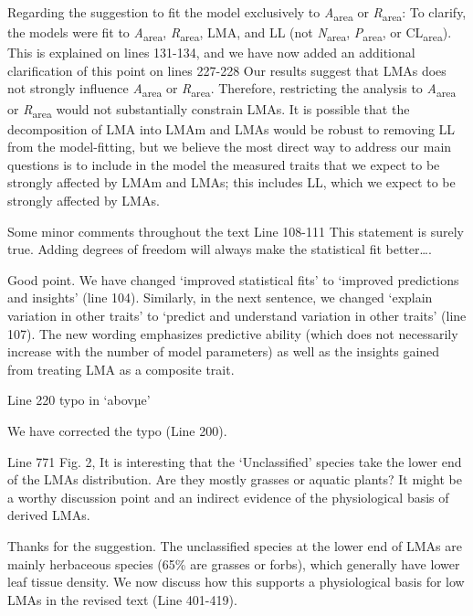 \documentclass[
  12pt,
  letterpaper,
  DIV=11,
  numbers=noendperiod]{scrartcl}
\renewenvironment{quote}
  {\begin{customblockquote}\color{blockquote-text}\ignorespaces}
  {\end{customblockquote}}
\begin{document}
Regarding the suggestion to fit the model exclusively to
\emph{A}\textsubscript{area} or \emph{R}\textsubscript{area}: To
clarify, the models were fit to \emph{A}\textsubscript{area},
\emph{R}\textsubscript{area}, LMA, and LL (not
\emph{N}\textsubscript{area}, \emph{P}\textsubscript{area}, or
CL\textsubscript{area}). This is explained on lines 131-134, and we have
now added an additional clarification of this point on lines 227-228 Our
results suggest that LMAs does not strongly influence
\emph{A}\textsubscript{area} or \emph{R}\textsubscript{area}. Therefore,
restricting the analysis to \emph{A}\textsubscript{area} or
\emph{R}\textsubscript{area} would not substantially constrain LMAs. It
is possible that the decomposition of LMA into LMAm and LMAs would be
robust to removing LL from the model-fitting, but we believe the most
direct way to address our main questions is to include in the model the
measured traits that we expect to be strongly affected by LMAm and LMAs;
this includes LL, which we expect to be strongly affected by LMAs.

\begin{quote}
Some minor comments throughout the text Line 108-111 This statement is
surely true. Adding degrees of freedom will always make the statistical
fit better\ldots.
\end{quote}

Good point. We have changed `improved statistical fits' to `improved
predictions and insights' (line 104). Similarly, in the next sentence,
we changed `explain variation in other traits' to `predict and
understand variation in other traits' (line 107). The new wording
emphasizes predictive ability (which does not necessarily increase with
the number of model parameters) as well as the insights gained from
treating LMA as a composite trait.

\begin{quote}
Line 220 typo in `abovµe'
\end{quote}

We have corrected the typo (Line 200).

\begin{quote}
Line 771 Fig. 2, It is interesting that the `Unclassified' species take
the lower end of the LMAs distribution. Are they mostly grasses or
aquatic plants? It might be a worthy discussion point and an indirect
evidence of the physiological basis of derived LMAs.
\end{quote}

Thanks for the suggestion. The unclassified species at the lower end of
LMAs are mainly herbaceous species (65\% are grasses or forbs), which
generally have lower leaf tissue density. We now discuss how this
supports a physiological basis for low LMAs in the revised text (Line
401-419).
\end{document}
